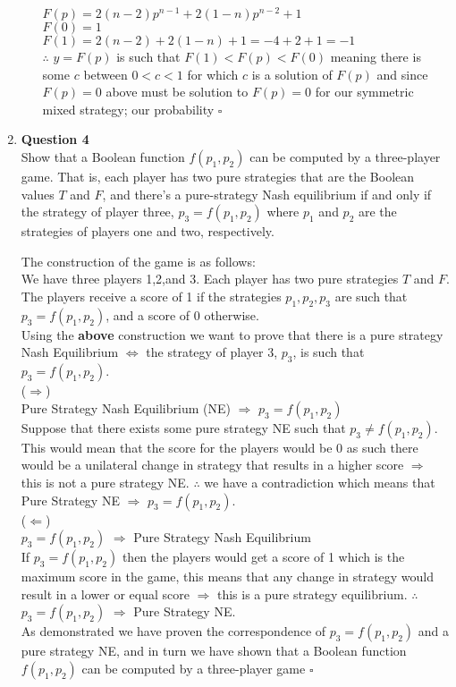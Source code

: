 \documentclass[12pt]{article}
\begin{document}
\begin{enumerate}
\begin{enumerate}
$F(p)=2(n-2)p^{n-1}+2(1-n)p^{n-2} +1$\\
$F(0)=1$\\
$F(1)=2(n-2)+2(1-n)+1 =-4+2+1=-1$\\
$\therefore $ $y=F(p)$ is such that $F(1) < F(p) < F(0)$ meaning there is some $c$ between $0<c<1$ for which $c$ is a solution of $F(p)$ and since $F(p)=0$ above must be solution to $F(p)=0$ for our symmetric mixed strategy; our probability $\square$
\end{enumerate}
\item \textbf{Question 4} \\
Show that a Boolean function $f(p_1, p_2)$ can be computed by a three-player game. That is, each player has two pure strategies that are the Boolean values $T$ and $F$, and there’s a pure-strategy Nash equilibrium if and only if the strategy of player three, $p_3 =f(p_1, p_2)$ where $p_1$ and $p_2$ are the strategies of players one and two, respectively.\par

The construction of the game is as follows: \\
We have three players 1,2,and 3. Each player has two pure strategies $T$ and $F$. The players receive a score of 1 if the strategies $p_1,p_2,p_3$ are such that $p_3=f(p_1,p_2)$, and a score of 0 otherwise.\\
Using the \textbf{above} construction we want to prove that there is a pure strategy Nash Equilibrium $\iff $ the strategy of player 3, $p_3$, is such that $p_3=f(p_1,p_2)$.\\
($\Rightarrow $)\\
Pure Strategy Nash Equilibrium (NE) $\Rightarrow $ $p_3=f(p_1,p_2)$\\
Suppose that there exists some pure strategy NE such that $p_3 \neq f(p_1,p_2)$. This would mean that the score for the players would be 0 as such there would be a unilateral change in strategy that results in a higher score $\Rightarrow $ this is not a pure strategy NE. $\therefore $ we have a contradiction which means that Pure Strategy NE $\Rightarrow $ $p_3=f(p_1,p_2)$.\\
($\Leftarrow $)\\
$p_3=f(p_1,p_2)$ $\Rightarrow $ Pure Strategy Nash Equilibrium\\
If $p_3=f(p_1,p_2)$ then the players would get a score of 1 which is the maximum score in the game, this means that any change in strategy would result in a lower or equal score $\Rightarrow $ this is a pure strategy equilibrium. $\therefore $ $p_3=f(p_1,p_2)$ $\Rightarrow $ Pure Strategy NE.\\
As demonstrated we have proven the correspondence of $p_3 =f(p_1, p_2)$ and a pure strategy NE, and in turn we have shown that a Boolean function $f(p_1,p_2)$ can be computed by a three-player game $\square $
\end{enumerate}
\end{document}
